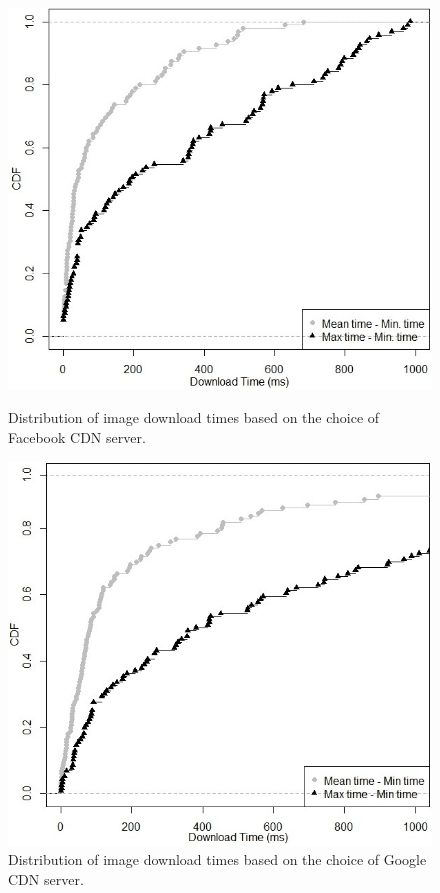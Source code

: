 \documentclass{llncs}
\begin{document}
\begin{figure}
  \includegraphics[width=\linewidth]{figures/download_facebook_local_dns}
  \caption{Distribution of image download times based on the choice of Facebook CDN server.}
   \label{fig:download_facebook_local_dns}
\endminipage\hfill
{}%
  \includegraphics[width=\linewidth]{figures/download_google_local_dns}
  \caption{Distribution of image download times based on the choice of Google CDN server.}
   \label{fig:download_google_local_dns}
\endminipage
\end{figure}
\end{document}
